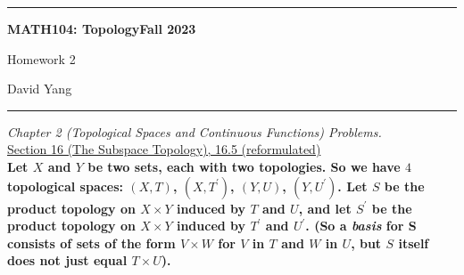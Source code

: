 \documentclass[11pt]{article}
\begin{document}
	\hrule
	\begin{center}
        \textbf{MATH104: Topology}\hfill \textbf{Fall 2023}\newline

		{\Large Homework 2}

		David Yang
	\end{center}

\hrule

\vspace{1em}

\textit{Chapter 2 (Topological Spaces and Continuous Functions) Problems.} \\

\underline{Section 16 (The Subspace Topology), 16.5 (reformulated)} \\

\textbf{Let $X$ and $Y$ be two sets, each with two topologies. So we have $4$ topological spaces: $(X, T)$, $(X, T^{\prime})$, $(Y, U)$, $(Y, U^{\prime})$. 
Let $S$ be the product topology on $X \times Y$ induced by $T$ and $U$, and let $S^{\prime}$ be the product topology on $X \times Y$ induced by $T^{\prime}$ and $U^{\prime}$. 
(So a \textit{basis} for S consists of sets of the form $V \times W$ for $V$ in $T$ and $W$ in $U$,  but $S$ itself does not just equal $T \times U$).}
\end{document}
